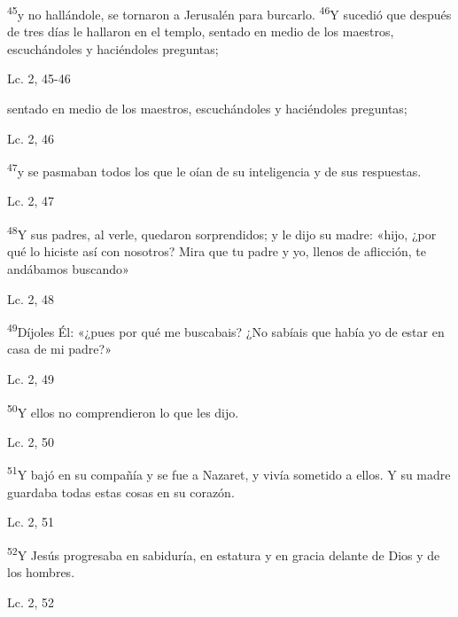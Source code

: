 \documentclass[a4paper,11pt]{article}
\begin{document}
      \textsuperscript{45}y no hallándole, se tornaron a Jerusalén para burcarlo. \textsuperscript{46}Y sucedió que después de tres días le hallaron en el templo,
      sentado en medio de los maestros, escuchándoles y haciéndoles preguntas;
      \begin{flushright}
        Lc. 2, 45-46       
      \end{flushright}
      
      sentado en medio de los maestros, escuchándoles y haciéndoles preguntas;
      \begin{flushright}
        Lc. 2, 46       
      \end{flushright}
      
      \textsuperscript{47}y se pasmaban todos los que le oían de su inteligencia y de sus respuestas.
      \begin{flushright}
        Lc. 2, 47     
      \end{flushright}

      \textsuperscript{48}Y sus padres, al verle, quedaron sorprendidos; y le dijo su madre: «hijo, ¿por qué lo hiciste así con nosotros? Mira que tu padre
      y yo, llenos de aflicción, te andábamos buscando»
      \begin{flushright}
        Lc. 2, 48     
      \end{flushright}
      
      \textsuperscript{49}Díjoles Él: «¿pues por qué me buscabais? ¿No sabíais que había yo de estar en casa de mi padre?»
      \begin{flushright}
        Lc. 2, 49        
      \end{flushright}
      
      \textsuperscript{50}Y ellos no comprendieron lo que les dijo.
      \begin{flushright}
        Lc. 2, 50        
      \end{flushright}
      
      \textsuperscript{51}Y bajó en su compañía y se fue a Nazaret, y vivía sometido a ellos. Y su madre guardaba todas estas
      cosas en su corazón.
      \begin{flushright}
        Lc. 2, 51       
      \end{flushright}     
      
      \textsuperscript{52}Y Jesús progresaba en sabiduría, en estatura y en gracia delante de Dios y de los hombres.
      \begin{flushright}
        Lc. 2, 52        
      \end{flushright}
            
\end{document}
